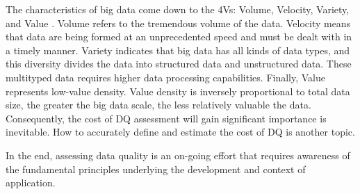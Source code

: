 \documentclass[pdftex,english,oribibl]{llncs}
\begin{document}
The characteristics of big data come down to the 4Vs: Volume, Velocity, Variety, and Value \cite{Katal2013BigData}. Volume refers to the tremendous volume of the data. Velocity means that data are being formed at an unprecedented speed and must be dealt with in a timely manner. Variety indicates that big data has all kinds of data types, and this diversity divides the data into structured data and unstructured data. These multityped data requires higher data processing capabilities.
Finally, Value represents low-value density. Value density is inversely proportional to total data size, the greater the big data scale, the less relatively valuable the data. Consequently, the cost of DQ assessment will gain significant importance is inevitable. How to accurately define and estimate the cost of DQ is another topic.

In the end, assessing data quality is an on-going effort that requires awareness of the fundamental principles underlying the development and context of application.


\end{document}
